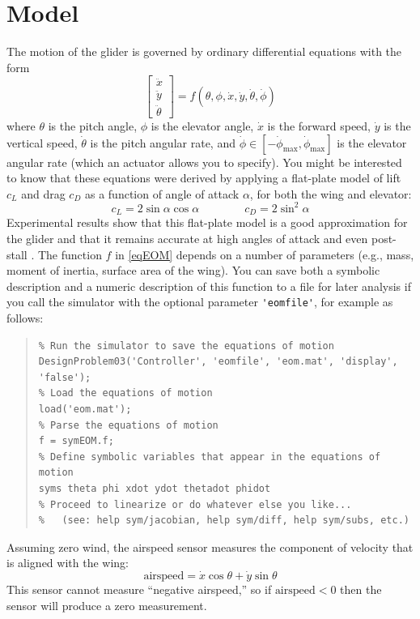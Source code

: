 \documentclass[conf]{new-aiaa}
\begin{document}
\section{Model}

The motion of the glider is governed by ordinary differential equations with the form
\begin{equation}
\label{eqEOM}
\begin{bmatrix} \ddot{x} \\ \ddot{y} \\ \ddot{\theta} \end{bmatrix} = f(\theta,\phi,\dot{x},\dot{y},\dot{\theta},\dot{\phi})
\end{equation}
where $\theta$ is the pitch angle, $\phi$ is the elevator angle, $\dot{x}$ is the forward speed, $\dot{y}$ is the vertical speed, $\dot{\theta}$ is the pitch angular rate, and $\dot{\phi}\in[-\dot{\phi}_\text{max}, \dot{\phi}_\text{max}]$ is the elevator angular rate (which an actuator allows you to specify). You might be interested to know that these equations were derived by applying a flat-plate model of lift $c_{L}$ and drag $c_{D}$ as a function of angle of attack $\alpha$, for both the wing and elevator:
\begin{equation*}
c_{L} = 2\sin\alpha \cos\alpha
\qquad\qquad
c_{D} = 2\sin^{2}\alpha
\end{equation*}
Experimental results show that this flat-plate model is a good approximation for the glider and that it remains accurate at high angles of attack and even post-stall \cite{Moore2014}. The function $f$ in \eqref{eqEOM} depends on a number of parameters (e.g., mass, moment of inertia, surface area of the wing). You can save both a symbolic description and a numeric description of this function to a file for later analysis if you call the simulator with the optional parameter \lstinline|'eomfile'|, for example as follows:
\begin{quote}
\begin{lstlisting}
% Run the simulator to save the equations of motion
DesignProblem03('Controller', 'eomfile', 'eom.mat', 'display', 'false');
% Load the equations of motion
load('eom.mat');
% Parse the equations of motion
f = symEOM.f;
% Define symbolic variables that appear in the equations of motion
syms theta phi xdot ydot thetadot phidot
% Proceed to linearize or do whatever else you like...
% 	(see: help sym/jacobian, help sym/diff, help sym/subs, etc.)
\end{lstlisting}
\end{quote}
Assuming zero wind, the airspeed sensor measures the component of velocity that is aligned with the wing:
\[
\text{airspeed} = \dot{x} \cos\theta + \dot{y} \sin\theta
\]
This sensor cannot measure ``negative airspeed,'' so if $\text{airspeed} < 0$ then the sensor will produce a zero measurement.
\end{document}
